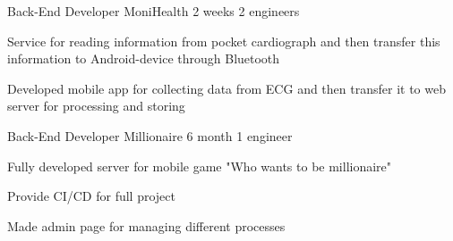 \begin{cventries}   
    
  \cventry
    {Back-End Developer} %
    {MoniHealth} %
    {2 weeks} %
    {2 engineers} %
    {
      \begin{cvitems} %
        \item { Service for reading information from pocket cardiograph and then transfer this information to Android-device through Bluetooth }
        \item { Developed mobile app for collecting data from ECG and then transfer it to web server for processing and storing }
      \end{cvitems}
    }
    
    \cventry
    {Back-End Developer} %
    {Millionaire} %
    {6 month} %
    {1 engineer} %
    {
      \begin{cvitems} %
        \item { Fully developed server for mobile game "Who wants to be millionaire"}
        \item { Provide CI/CD for full project }
        \item { Made admin page for managing different processes}
      \end{cvitems}
    }
\end{cventries}
